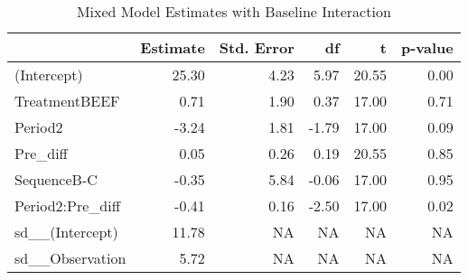 \begin{table}

\caption{\label{tab:proteinDataEstimates}Mixed Model Estimates with Baseline Interaction}
\centering
\begin{tabular}[t]{>{}l|rrrrr}
\toprule
 & Estimate & Std. Error & df & t & p-value\\
\midrule
(Intercept) & 25.30 & 4.23 & 5.97 & 20.55 & 0.00\\
TreatmentBEEF & 0.71 & 1.90 & 0.37 & 17.00 & 0.71\\
Period2 & -3.24 & 1.81 & -1.79 & 17.00 & 0.09\\
Pre\_diff & 0.05 & 0.26 & 0.19 & 20.55 & 0.85\\
SequenceB-C & -0.35 & 5.84 & -0.06 & 17.00 & 0.95\\
\addlinespace
Period2:Pre\_diff & -0.41 & 0.16 & -2.50 & 17.00 & 0.02\\
sd\_\_(Intercept) & 11.78 & NA & NA & NA & NA\\
sd\_\_Observation & 5.72 & NA & NA & NA & NA\\
\bottomrule
\end{tabular}
\end{table}
